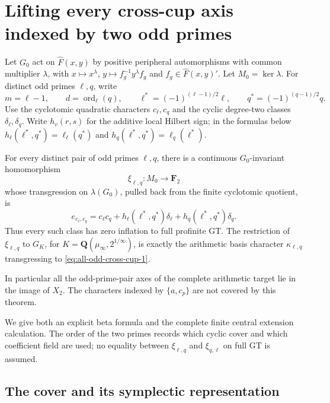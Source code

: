 \section{Lifting every cross-cup axis indexed by two odd primes}
\label{sec:all-odd-cross-cup-lifts}

Let \(G_0\) act on \(\widehat F(x,y)\) by positive
peripheral automorphisms with common multiplier
\(\lambda\), with \(x\mapsto x^\lambda\),
\(y\mapsto f_g^{-1}y^\lambda f_g\) and \(f_g\in\widehat F(x,y)'\).
Let \(M_0=\ker\lambda\).
For distinct odd primes \(\ell,q\), write
\[
 m=\ell-1,\qquad d=\operatorname{ord}_{\ell}(q),\qquad
 \ell^*=(-1)^{(\ell-1)/2}\ell,\qquad
 q^*=(-1)^{(q-1)/2}q .
\]
Use the cyclotomic quadratic characters \(c_\ell,c_q\)
and the cyclic degree-two classes \(\delta_\ell,\delta_q\).
Write \(h_v(r,s)\) for the additive local Hilbert sign; in
the formulas below \(h_\ell(\ell^*,q^*)=\ell_\ell(q^*)\)
and \(h_q(\ell^*,q^*)=\ell_q(\ell^*)\).

\begin{theorem}\label{thm:all-odd-cross-cup-lifts}
For every distinct pair of odd primes \(\ell,q\), there
is a continuous \(G_0\)-invariant homomorphism
\[
                         \xi_{\ell,q}:M_0\to\mathbf F_2
\]
whose transgression on \(\lambda(G_0)\), pulled back from the
finite cyclotomic quotient, is
\begin{equation}
 e_{c_\ell,c_q}
   =c_\ell c_q+
        h_\ell(\ell^*,q^*)\delta_\ell+
        h_q(\ell^*,q^*)\delta_q.                          \label{eq:all-odd-cross-cup-1}
\end{equation}
Thus every such class has zero inflation to full
profinite GT. The restriction of \(\xi_{\ell,q}\) to
\(G_K\), for \(K=\mathbf Q(\mu_\infty,2^{1/\infty})\),
is exactly the arithmetic basis character
\(\kappa_{\ell,q}\) transgressing to \eqref{eq:all-odd-cross-cup-1}.

In particular all the odd-prime-pair axes of the complete
arithmetic target lie in the image of \(X_2\).
The characters indexed by \(\{a,c_p\}\) are not covered
by this theorem.
\end{theorem}

We give both an explicit beta formula and the complete
finite central extension calculation. The order of the
two primes records which cyclic cover and which
coefficient field are used; no equality between
\(\xi_{\ell,q}\) and \(\xi_{q,\ell}\) on full GT is assumed.

\subsection{The cover and its symplectic representation}


